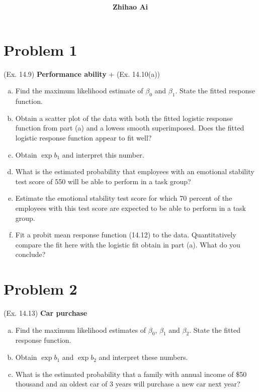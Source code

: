 \documentclass[10pt]{report}
\title{
	\vspace{2in}
	\textmd{\textbf{\hwCourse\\\hwTitle}}\\
	\vspace{0.3in}\large{\textit{\hmClassInstructor}}
	\vspace{3in}
}
\author{\textbf{Zhihao Ai}}
\date{}
\begin{document}
\maketitle

\section*{Problem 1}
(Ex. 14.9) \textbf{Performance ability} + (Ex. 14.10(a))
\begin{enumerate}[a.]
	\item 
	Find the maximum likelihood estimate of $\beta_0$ and $\beta_1$. State the fitted response function.
	
	\item 
	Obtain a scatter plot of the data with both the fitted logistic response function from part (a) and a lowess smooth superimposed. Does the fitted logistic response function appear to fit well?
	
	\item 
	Obtain $\exp{b_1}$ and interpret this number.
	
	\item 
	What is the estimated probability that employees with an emotional stability test score of 550 will be able to perform in a task group?
	
	\item 
	Estimate the emotional stability test score for which 70 percent of the employees with this test score are expected to be able to perform in a task group.
	
	\item 
	Fit a probit mean response function (14.12) to the data. Quantitatively compare the fit here with the logistic fit obtain in part (a). What do you conclude?
\end{enumerate}

\section*{Problem 2}
(Ex. 14.13) \textbf{Car purchase}
\begin{enumerate}[a.]
	\item 
	Find the maximum likelihood estimates of $\beta_0$, $\beta_1$ and $\beta_2$. State the fitted response function.
	
	\item 
	Obtain $\exp{b_1}$ and $\exp{b_2}$ and interpret these numbers.
	
	\item 
	What is the estimated probability that a family with annual income of \$50 thousand and an oldest car of 3 years will purchase a new car next year?
\end{enumerate}
\end{document}
